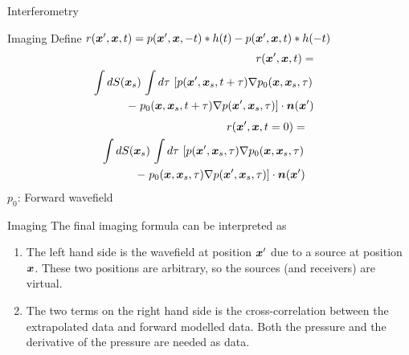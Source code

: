 \documentclass[xcolor=dvipsnames,notes]{beamer}
\begin{document}
\begin{frame}{Interferometry}
\begin{figure}
\end{figure}
\end{frame}
\begin{frame}{Imaging}
Define $r(\mbox{\boldmath $x$}',\mbox{\boldmath $x$},t) = p(\mbox{\boldmath $x$}',\mbox{\boldmath $x$},-t)*h(t)-p(\mbox{\boldmath $x$}',\mbox{\boldmath $x$},t)*h(-t)$
\begin{eqnarray}
 r(\mbox{\boldmath $x$}',\mbox{\boldmath $x$},t)=\nonumber\\
\int dS(\mbox{\boldmath $x$}_s)\, \int d\tau\, \left[p(\mbox{\boldmath $x$}',\mbox{\boldmath $x$}_s,t+\tau)\nabla p_0(\mbox{\boldmath $x$},\mbox{\boldmath $x$}_s,\tau)\right.\nonumber\\
   -\left. p_0(\mbox{\boldmath $x$},\mbox{\boldmath $x$}_s,t+\tau)\nabla p(\mbox{\boldmath $x$}',\mbox{\boldmath $x$}_s,\tau)\right]\cdot \mbox{\boldmath $n$}(\mbox{\boldmath $x$}')
&&                   \label{eq:9300}
\end{eqnarray}
\begin{eqnarray}
 r(\mbox{\boldmath $x$}',\mbox{\boldmath $x$},t=0)=\nonumber\\
\int dS(\mbox{\boldmath $x$}_s)\, \int d\tau\, \left[p(\mbox{\boldmath $x$}',\mbox{\boldmath $x$}_s,\tau)\nabla p_0(\mbox{\boldmath $x$},\mbox{\boldmath $x$}_s,\tau)\right.\nonumber\\
   -\left. p_0(\mbox{\boldmath $x$},\mbox{\boldmath $x$}_s,\tau)\nabla p(\mbox{\boldmath $x$}',\mbox{\boldmath $x$}_s,\tau)\right]\cdot \mbox{\boldmath $n$}(\mbox{\boldmath $x$}')
&&                   \label{eq:9400}
\end{eqnarray}
$p_0$: Forward wavefield 
\end{frame}
\begin{frame}{Imaging}
The final imaging formula can be interpreted as
\begin{enumerate}
\item The left hand side is the wavefield at position $\mbox{\boldmath $x$}'$ due to a source at position $\mbox{\boldmath $x$}$.
      These two positions are arbitrary, so the sources (and receivers) are virtual.
\item The two terms on the right hand side is the cross-correlation between the extrapolated data
      and forward modelled data. Both the pressure and the derivative of the pressure are needed as
      data.
\end{enumerate}
\end{frame}
\end{document}

